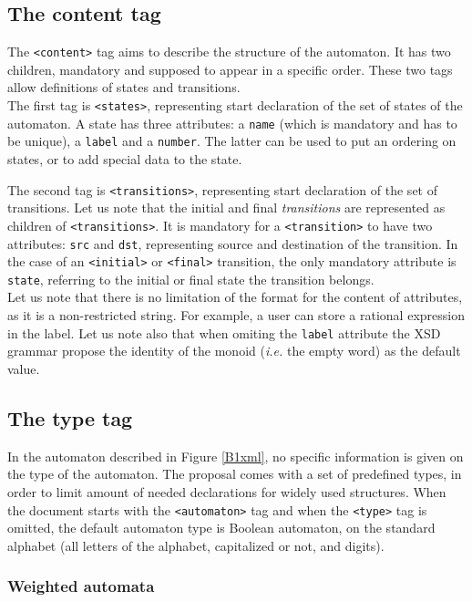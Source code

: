 \documentclass[a4paper]{article}
\begin{document}
\subsection{The content tag}
The \verb|<content>| tag aims to describe the structure of the
automaton. It has two children, mandatory and supposed to appear in a
specific order. These two tags allow definitions of states and
transitions. \\

The first tag is \verb|<states>|, representing start declaration of
the set of states of the automaton. A state has three attributes: a
\verb|name| (which is mandatory and has to be unique), a \verb|label|
and a \verb|number|. The latter can be used to put an ordering on states,
or to add special data to the state.

The second tag is \verb|<transitions>|, representing start declaration
of the set of transitions. Let us note that the initial and final
\textit{transitions} are represented as children of
\verb|<transitions>|. It is mandatory for a \verb|<transition>| to
have two attributes: \verb|src| and \verb|dst|, representing source
and destination of the transition. In the case of an \verb|<initial>|
or \verb|<final>| transition, the only mandatory attribute is
\verb|state|, referring to
the initial or final state the transition belongs.\\

Let us note that there is no limitation of the format for the content
of attributes, as it is a non-restricted string. For example, a user
can store a rational expression in the label.  Let us note also that
when omiting the \verb|label| attribute the XSD grammar propose the
identity of the monoid ({\it i.e.} the empty word) as the default value.

\subsection{The type tag}
In the automaton described in Figure \ref{B1xml}, no specific
information is given on the type of the automaton. The proposal comes
with a set of predefined types, in order to limit amount of needed
declarations for widely used structures. When the document starts with
the \verb|<automaton>| tag and when the \verb|<type>| tag is omitted,
the default automaton type is Boolean automaton, on the standard
alphabet (all letters of the alphabet, capitalized or not, and digits).


\subsubsection{Weighted automata}
\label{weightedautomata}
\end{document}
